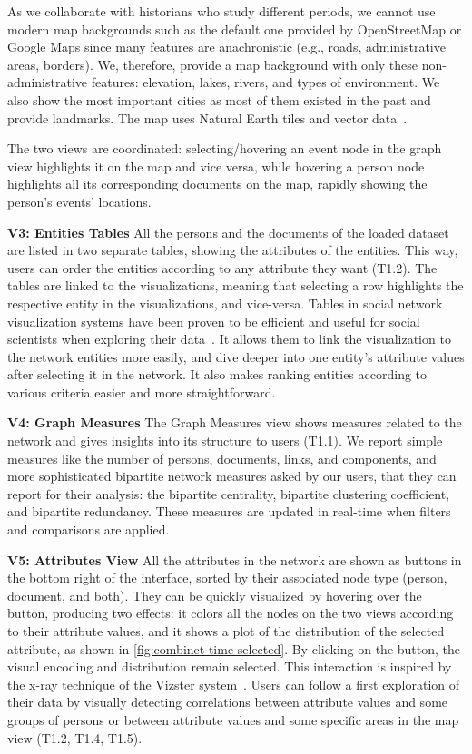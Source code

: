 As we collaborate with historians who study different periods, we cannot use modern map backgrounds such as the default one provided by OpenStreetMap or Google Maps since many features are anachronistic (e.g., roads, administrative areas, borders). We, therefore, provide a map background with only these non-administrative features: elevation, lakes, rivers, and types of environment.
We also show the most important cities as most of them existed in the past and provide landmarks.
The map uses Natural Earth tiles and vector data~\cite{NaturalEarth}.

The two views are coordinated: selecting/hovering an event node in the graph view highlights it on the map and vice versa, while hovering a person node highlights all its corresponding documents on the map, rapidly showing the person's events' locations.

\noindent\textbf{V3: Entities Tables}
All the persons and the documents of the loaded dataset are listed in two separate tables, showing the attributes of the entities.
This way, users can order the entities according to any attribute they want (T1.2).
The tables are linked to the visualizations, meaning that selecting a row highlights the respective entity in the visualizations, and vice-versa.
Tables in social network visualization systems have been proven to be efficient and useful for social scientists when exploring their data~\cite{bezerianosGraphDiceSystemExploring2010}.
It allows them to link the visualization to the network entities more easily, and dive deeper into one entity's attribute values after selecting it in the network.
It also makes ranking entities according to various criteria easier and more straightforward.

\noindent\textbf{V4: Graph Measures}
The Graph Measures view shows measures related to the network and gives insights into its structure to users (T1.1).
We report simple measures like the number of persons, documents, links, and components, and more sophisticated bipartite network measures asked by our users, that they can report for their analysis: the bipartite centrality, bipartite clustering coefficient, and bipartite redundancy. 
These measures are updated in real-time when filters and comparisons are applied.


\noindent\textbf{V5: Attributes View}
All the attributes in the network are shown as buttons in the bottom right of the interface, sorted by their associated node type (person, document, and both).
They can be quickly visualized by hovering over the button, producing two effects: it colors all the nodes on the two views according to their attribute values, and it shows a plot of the distribution of the selected attribute, as shown in \autoref{fig:combinet-time-selected}.
By clicking on the button, the visual encoding and distribution remain selected.
 This interaction is inspired by the x-ray technique of the Vizster system~\cite{heerVizsterVisualizingOnline2005}.
Users can follow a first exploration of their data by visually detecting correlations between attribute values and some groups of persons or between attribute values and some specific areas in the map view (T1.2, T1.4, T1.5).

